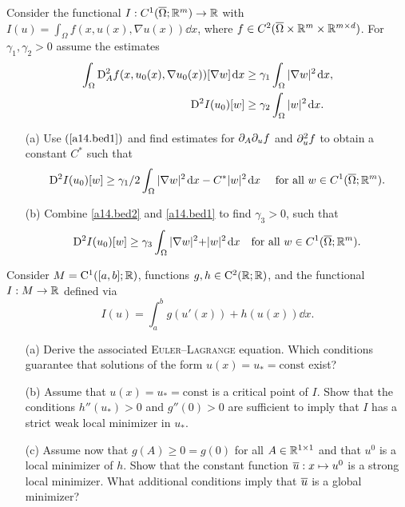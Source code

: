 \documentclass[12pt,a4paper]{article}
\begin{document}
Consider the functional $I:C^1(\overline\Omega;{\mathbb R}^m) \to {\mathbb R}$ with
$I(u) = \int_\Omega f(x,u(x),\nabla u(x))\dd x$, where $f\in
C^2(\overline\Omega\times{\mathbb R}^m\times {\mathbb R}^{m\times d})$. 
For $\gamma_1, \gamma_2 > 0$ assume the estimates
\begin{align}
  \label{a14.bed1}
   \int_\Omega {\mathrm D}_A^2f(x,u_0(x),\nabla u_0(x)) [\nabla w]\;\!\mathrm{d}
   x & \geq \gamma_1\int_\Omega |\nabla w|^2\;\!\mathrm{d} x ,\\ 
  \label{a14.bed2}
  {\mathrm D}^2I(u_0)[w] & \geq \gamma_2 \int_\Omega |w|^2 \;\!\mathrm{d} x.
\end{align}
\begin{itemize}
\item[(a)] Use $(\ref{a14.bed1})$ and find estimates for  $\partial_A\partial_uf$
and $\partial^2_u f$ to obtain a constant $C^*$ such that 
\[
{\mathrm D}^2 I(u_0)[w] \geq \gamma_1/2 \int_\Omega |\nabla w|^2\;\!\mathrm{d} x 
- C^* |w|^2 \;\!\mathrm{d} x \quad\text{ for all }w\in C^1(\overline\Omega;{\mathbb R}^m).
\]
\item[(b)] Combine \eqref{a14.bed2} and \eqref{a14.bed1} to find  $\gamma_3 >
0$, such that 
\[
{\mathrm D}^2I(u_0)[w] \geq \gamma_3\int_\Omega |\nabla w|^2
{+} |w|^2 \;\!\mathrm{d} x \ \ \text{   for all } w\in C^1(\overline{\Omega};{\mathbb R}^m).
\]
\end{itemize}

Consider $M= {\mathrm C}^1([a,b];{\mathbb R})$, functions 
$g,h \in {\mathrm C}^2({\mathbb R};{\mathbb R})$,  and the functional $I:M\to{\mathbb R}$ defined via
\[
 I(u) = \int_a^b g(u'(x)) + h(u(x))\dd x. 
\]
\begin{itemize}
\item[(a)] Derive the associated \textsc{Euler--Lagrange} equation. Which
conditions guarantee that solutions of the form $u(x)=u_* =
\mathrm{const}$ exist?
\item[(b)] Assume that $u(x) = u_* = \mathrm{const}$ is a critical point
  of $I$. Show that the conditions 
$h''(u_*) > 0$ and $g''(0) > 0$ are sufficient to imply that $I$ has a
strict weak local minimizer in $u_*$.
\item[(c)]
Assume now that $g(A) \ge 0=g(0)$ for all $A \in
  {\mathbb R}^{1\times{}1}$ and that $u^0$ is a local minimizer of $h$.
Show that the constant function $\overline u:x\mapsto u^0$ is a strong local
minimizer. What additional conditions imply that $\overline u$ is a global
minimizer? 
\end{itemize}
\end{document}
